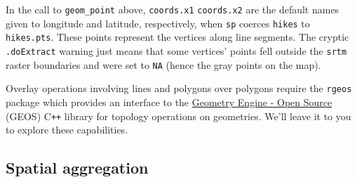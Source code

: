 \documentclass[12pt,oneside]{book}\usepackage[]{graphicx}\usepackage[]{color}
\begin{document}
In the call to \verb+geom_point+ above, \verb+coords.x1+ \verb+coords.x2+ are the default names given to longitude and latitude, respectively, when \verb+sp+ coerces \verb+hikes+ to \verb+hikes.pts+. These points represent the vertices along line segments. The cryptic \verb+.doExtract+ warning just means that some vertices' points fell outside the \verb+srtm+ raster boundaries and were set to \verb+NA+ (hence the gray points on the map).

Overlay operations involving lines and polygons over polygons require the \verb+rgeos+ package which provides an interface to the \href{https://trac.osgeo.org/geos/}{Geometry Engine - Open Source} (GEOS) C\texttt{++} library for topology operations on geometries. We'll leave it to you to explore these capabilities.

\subsection{Spatial aggregation}\label{SEC:AGGREGATE}
\end{document}
